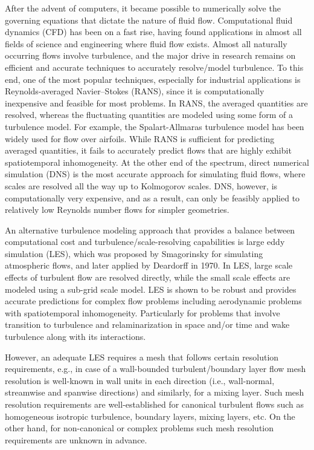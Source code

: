 After the advent of computers, it became possible to numerically solve the governing equations that dictate the nature of fluid flow.
Computational fluid dynamics (CFD) has been on a fast rise, having found applications in almost all fields of science and engineering where fluid flow exists.
Almost all naturally occurring flows involve turbulence, and the major drive in research remains on efficient and accurate techniques to accurately resolve/model turbulence.
To this end, one of the most popular techniques, especially for industrial applications is Reynolds-averaged Navier–Stokes (RANS), since it is computationally inexpensive and feasible for most problems.
In RANS, the averaged quantities are resolved, whereas the fluctuating quantities are modeled using some form of a turbulence model. For example, the Spalart-Allmaras turbulence model \cite{bib:Spalart} has been widely used for flow over airfoils.
While RANS is sufficient for predicting averaged quantities, it fails to accurately predict flows that are highly exhibit spatiotemporal inhomogeneity.
At the other end of the spectrum, direct numerical simulation (DNS) is the most accurate approach for simulating fluid flows, where scales are resolved all the way up to Kolmogorov scales.
DNS, however, is computationally very expensive, and as a result, can only be feasibly applied to relatively low Reynolds number flows for simpler geometries.

An alternative turbulence modeling approach that provides a balance between computational cost and turbulence/scale-resolving capabilities is large eddy simulation (LES), which was proposed by Smagorinsky \cite{bib:smag} for simulating atmospheric flows, and later applied by Deardorff \cite{bib:deardorff1970} in 1970.
In LES, large scale effects of turbulent flow are resolved directly, while the small scale effects are modeled using a sub-grid scale model.
LES is shown to be robust and provides accurate predictions for complex flow problems including aerodynamic problems with spatiotemporal inhomogeneity. Particularly for problems that involve transition to turbulence and relaminarization in space and/or time and wake turbulence along with its interactions.

However, an adequate LES requires a mesh that follows certain resolution requirements, e.g., in case of a wall-bounded turbulent/boundary layer flow mesh resolution is well-known in wall units in each direction (i.e., wall-normal, streamwise and spanwise directions) and similarly, for a mixing layer.
Such mesh resolution requirements are well-established for canonical turbulent flows such as homogeneous isotropic turbulence, boundary layers, mixing layers, etc. 
On the other hand, for non-canonical or complex problems such mesh resolution requirements are unknown in advance. 

